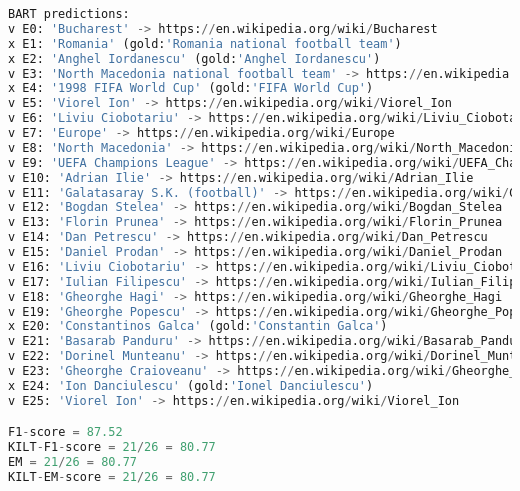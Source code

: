 \documentclass[11pt]{article}
\begin{document}
\begin{figure*}[!ht]
\begin{lstlisting}[language=Python,firstnumber=1]
BART predictions:
v E0: 'Bucharest' -> https://en.wikipedia.org/wiki/Bucharest
x E1: 'Romania' (gold:'Romania national football team')
x E2: 'Anghel Iordanescu' (gold:'Anghel Iordanescu')
v E3: 'North Macedonia national football team' -> https://en.wikipedia.org/wiki/North_Macedonia_national_football_team
x E4: '1998 FIFA World Cup' (gold:'FIFA World Cup')
v E5: 'Viorel Ion' -> https://en.wikipedia.org/wiki/Viorel_Ion
v E6: 'Liviu Ciobotariu' -> https://en.wikipedia.org/wiki/Liviu_Ciobotariu
v E7: 'Europe' -> https://en.wikipedia.org/wiki/Europe
v E8: 'North Macedonia' -> https://en.wikipedia.org/wiki/North_Macedonia
v E9: 'UEFA Champions League' -> https://en.wikipedia.org/wiki/UEFA_Champions_League
v E10: 'Adrian Ilie' -> https://en.wikipedia.org/wiki/Adrian_Ilie
v E11: 'Galatasaray S.K. (football)' -> https://en.wikipedia.org/wiki/Galatasaray_S.K._(football)
v E12: 'Bogdan Stelea' -> https://en.wikipedia.org/wiki/Bogdan_Stelea
v E13: 'Florin Prunea' -> https://en.wikipedia.org/wiki/Florin_Prunea
v E14: 'Dan Petrescu' -> https://en.wikipedia.org/wiki/Dan_Petrescu
v E15: 'Daniel Prodan' -> https://en.wikipedia.org/wiki/Daniel_Prodan
v E16: 'Liviu Ciobotariu' -> https://en.wikipedia.org/wiki/Liviu_Ciobotariu
v E17: 'Iulian Filipescu' -> https://en.wikipedia.org/wiki/Iulian_Filipescu
v E18: 'Gheorghe Hagi' -> https://en.wikipedia.org/wiki/Gheorghe_Hagi
v E19: 'Gheorghe Popescu' -> https://en.wikipedia.org/wiki/Gheorghe_Popescu
x E20: 'Constantinos Galca' (gold:'Constantin Galca')
v E21: 'Basarab Panduru' -> https://en.wikipedia.org/wiki/Basarab_Panduru
v E22: 'Dorinel Munteanu' -> https://en.wikipedia.org/wiki/Dorinel_Munteanu
v E23: 'Gheorghe Craioveanu' -> https://en.wikipedia.org/wiki/Gheorghe_Craioveanu
x E24: 'Ion Danciulescu' (gold:'Ionel Danciulescu')
v E25: 'Viorel Ion' -> https://en.wikipedia.org/wiki/Viorel_Ion

F1-score = 87.52
KILT-F1-score = 21/26 = 80.77
EM = 21/26 = 80.77
KILT-EM-score = 21/26 = 80.77

\end{lstlisting}
    \caption{Entity linking BART predictions, schematic of 25 input-output pairs condensed, in each one a single entity in tagged. }
    \label{fig:entitylinking}
\end{figure*} 
\end{document}
